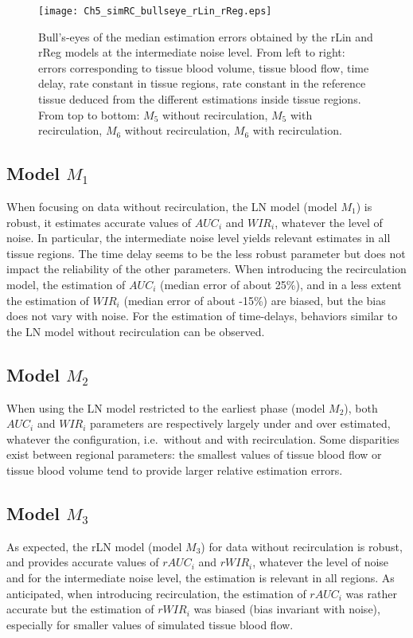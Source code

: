 \begin{figure}
\center
\texttt{[image: Ch5\_simRC\_bullseye\_rLin\_rReg.eps]}
\vspace{-5mm}
\caption{Bull's-eyes of the median estimation errors obtained by the rLin and rReg models at the intermediate noise level. From left to right: errors corresponding to tissue blood volume, tissue blood flow, time delay, rate constant in tissue regions, rate constant in the reference tissue deduced from the different estimations inside tissue regions. From top to bottom: $M_5$ without recirculation, $M_5$ with recirculation, $M_6$ without recirculation, $M_6$ with recirculation.}
\label{fig:be-rLinReg}
\vspace{-3mm}
\end{figure}

\subsection{Model $M_1$}
When focusing on data without recirculation, the LN model (model $M_1$) is robust, it estimates accurate values of $AUC_i$ and $WIR_i$, whatever the level of noise. In particular, the intermediate noise level yields relevant estimates in all tissue regions. The time delay seems to be the less robust parameter but does not impact the reliability of the other parameters.
When introducing the recirculation model, the estimation of $AUC_i$ (median error of about 25\%), and in a less extent the estimation of $WIR_i$ (median error of about -15\%) are biased, but the bias does not vary with noise. For the estimation of time-delays, behaviors similar to the LN model without recirculation can be observed.

\subsection{Model $M_2$}
When using the LN model restricted to the earliest phase (model $M_2$), both $AUC_i$ and $WIR_i$ parameters are respectively largely under and over estimated, whatever the configuration, i.e.~without and with recirculation. Some disparities exist between regional parameters: the smallest values of tissue blood flow or tissue blood volume tend to provide larger relative estimation errors.

\subsection{Model $M_3$}
As expected, the rLN model (model $M_3$) for data without recirculation is robust, and provides accurate values of $rAUC_i$ and $rWIR_i$, whatever the level of noise and for the intermediate noise level, the estimation is relevant in all regions. As anticipated, when introducing recirculation, the estimation of $rAUC_i$ was rather accurate but the estimation of $rWIR_i$ was biased (bias invariant with noise), especially for smaller values of simulated tissue blood flow.

